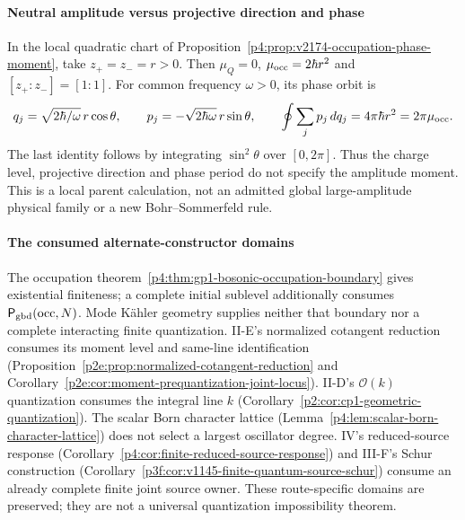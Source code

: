 \documentclass[12pt,a4paper]{article}
\begin{document}
\paragraph{Neutral amplitude versus projective direction and phase}
In the local quadratic chart of
Proposition~\ref{p4:prop:v2174-occupation-phase-moment}, take
$z_+=z_-=r>0$. Then $\mu_Q=0$, $\mu_{\rm occ}=2\hbar r^2$ and
$[z_+:z_-]=[1:1]$. For common frequency $\omega>0$, its phase orbit is
\[
 q_j=\sqrt{2\hbar/\omega}\,r\cos\theta,\qquad
 p_j=-\sqrt{2\hbar\omega}\,r\sin\theta,\qquad
 \oint\sum_jp_j\,dq_j=4\pi\hbar r^2=2\pi\mu_{\rm occ}.
\]
The last identity follows by integrating $\sin^2\theta$ over $[0,2\pi]$.
Thus the charge level, projective direction and phase period do not specify
the amplitude moment. This is a local parent calculation, not an admitted
global large-amplitude physical family or a new Bohr--Sommerfeld rule.



\paragraph{The consumed alternate-constructor domains}
The occupation theorem~\ref{p4:thm:gp1-bosonic-occupation-boundary} gives
existential finiteness; a complete initial sublevel additionally consumes
$\mathsf P_{\rm gbd}(\mathrm{occ},N)$. Mode K\"ahler geometry supplies
neither that boundary nor a complete interacting finite quantization.
II-E's normalized cotangent reduction consumes its moment level and
same-line identification
(Proposition~\ref{p2e:prop:normalized-cotangent-reduction} and
Corollary~\ref{p2e:cor:moment-prequantization-joint-locus}).
II-D's $\mathcal O(k)$ quantization consumes the integral line $k$
(Corollary~\ref{p2:cor:cp1-geometric-quantization}).
The scalar Born character lattice
(Lemma~\ref{p4:lem:scalar-born-character-lattice}) does not select a largest
oscillator degree. IV's reduced-source response
(Corollary~\ref{p4:cor:finite-reduced-source-response}) and III-F's Schur
construction (Corollary~\ref{p3f:cor:v1145-finite-quantum-source-schur})
consume an already complete finite joint source owner.
These route-specific domains are preserved; they are not a universal
quantization impossibility theorem.





\end{document}
